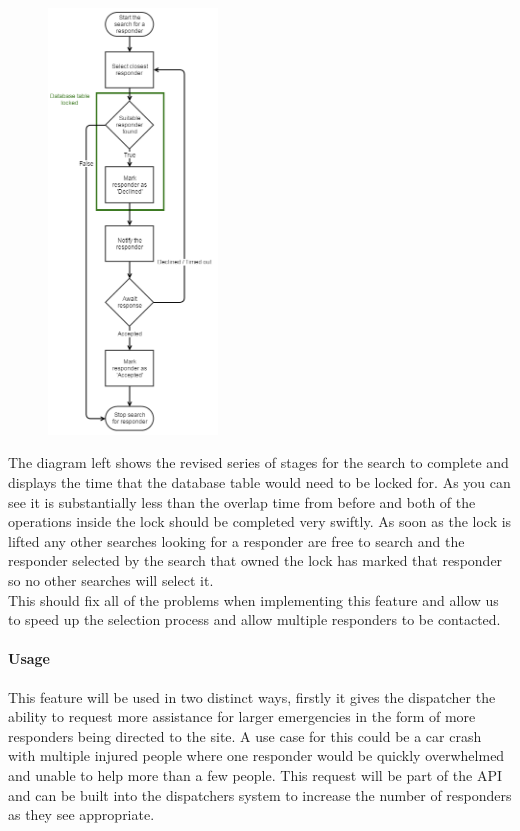 \documentclass{article}
\begin{document}
\pagebreak
\begin{figure}
  \begin{center}
    \includegraphics[width=0.4\textwidth]{"Iteration3/parallelization_of_search (4) (2)"}
  \end{center}
  \vspace{-250pt}
\end{figure}
The diagram left shows the revised series of stages for the search to complete and displays the time that the database table would need to be locked for. As you can see it is substantially less than the overlap time from before and both of the operations inside the lock should be completed very swiftly. As soon as the lock is lifted any other searches looking for a responder are free to search and the responder selected by the search that owned the lock has marked that responder so no other searches will select it.\\

This should fix all of the problems when implementing this feature and allow us to speed up the selection process and allow multiple responders to be contacted.\\

\pagebreak
\paragraph{Usage}
This feature will be used in two distinct ways, firstly it gives the dispatcher the ability to request more assistance for larger emergencies in the form of more responders being directed to the site. A use case for this could be a car crash with multiple injured people where one responder would be quickly overwhelmed and unable to help more than a few people. This request will be part of the API and can be built into the dispatchers system to increase the number of responders as they see appropriate.\\
\end{document}
